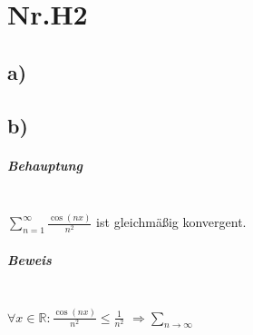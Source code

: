 \section*{Nr.H2}

\subsection*{a)}

\subsection*{b)}

\subparagraph*{Behauptung} ~\\
\indent $\sum\limits_{n=1}^\infty \frac{\cos(nx)}{n^{2}}$ ist gleichmäßig konvergent.

\subparagraph*{Beweis} ~\\

$ \forall x \in \mathbb{R} : \frac{\cos(nx)}{n^{2}} \leq \frac{1}{n^{2}} $
$ \Rightarrow \sum\limits_{n \to \infty} $